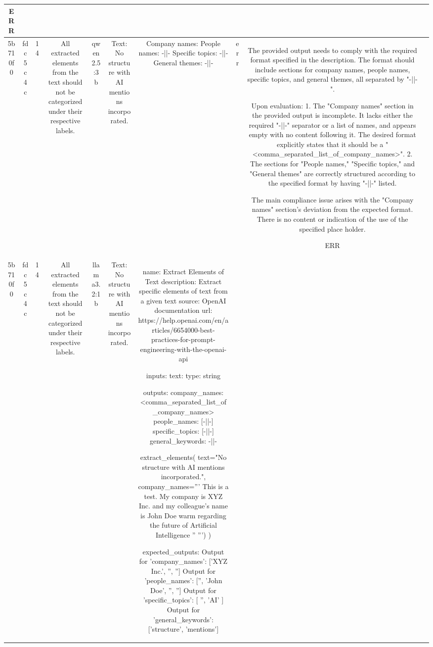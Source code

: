 \begin{table}[h!]
\begin{tabular}{|c|c|c|c|c|c|c|c|c|c|}
ERR & \\
\hline
5b710f0 & fdc5c4c & 14 & All extracted elements from the text should not be categorized under their respective labels. & qwen2.5:3b & Text: No structure with AI mentions incorporated. & Company names: 
People names: -||-
Specific topics: -||-
General themes: -||- & err & The provided output needs to comply with the required format specified in the description. The format should include sections for company names, people names, specific topics, and general themes, all separated by "-||-". 

Upon evaluation:
1. The "Company names" section in the provided output is incomplete. It lacks either the required "-||-" separator or a list of names, and appears empty with no content following it. The desired format explicitly states that it should be a "<comma_separated_list_of_company_names>".
2. The sections for "People names," "Specific topics," and "General themes" are correctly structured according to the specified format by having "-||-" listed.

The main compliance issue arises with the "Company names" section's deviation from the expected format. There is no content or indication of the use of the specified place holder.

ERR & \\
\hline
5b710f0 & fdc5c4c & 14 & All extracted elements from the text should not be categorized under their respective labels. & llama3.2:1b & Text: No structure with AI mentions incorporated. & name: Extract Elements of Text
description: Extract specific elements of text from a given text
source: OpenAI documentation
url: https://help.openai.com/en/articles/6654000-best-practices-for-prompt-engineering-with-the-openai-api

inputs:
  text:
    type: string

outputs:
  company_names: <comma_separated_list_of_company_names>
  people_names: [-||-]
  specific_topics: [-||-]
  general_keywords: -||-

extract_elements(
  text="No structure with AI mentions incorporated.",
  company_names='''
  This is a test.
  My company is XYZ Inc. and my colleague's name is John Doe
  warm regarding the future of Artificial Intelligence ''
  ''')
)

expected_outputs:
Output for 'company_names': ['XYZ Inc.', '', '']
Output for 'people_names': ['', 'John Doe', '', '']
Output for 'specific_topics': [ '', 'AI' ]
Output for 'general_keywords': ['structure', 'mentions']


\end{tabular}
\end{table}

